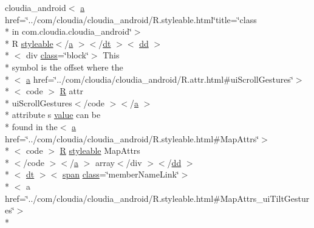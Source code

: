 \begin{DoxyCompactItemize}
cloudia\-\_\-android$<$ \hyperlink{style_8css_a5e8981582017bb8b84c21f148345d1f7}{a} href=\char`\"{}../com/cloudia/cloudia\-\_\-android/R.\-styleable.\-html\char`\"{}title=\char`\"{}class \\*
in com.\-cloudia.\-cloudia\-\_\-android\char`\"{}$>$\\*
 R \hyperlink{index-17_8html_ae6c9bf1e41380184b4b665ca9ab6ba0a}{styleable}$<$/\hyperlink{style_8css_a5e8981582017bb8b84c21f148345d1f7}{a} $>$$<$/\hyperlink{stylesheet_8css_a107565fb4039d33b041380d6e0ea1d80}{dt} $>$$<$ \hyperlink{stylesheet_8css_a47f4718a86835a7771ec592ece845221}{dd} $>$\\*
$<$ div \hyperlink{_tools_8html_acf06f836132665ba8114f5a414c2403f}{class}=\char`\"{}block\char`\"{}$>$ This \\*
symbol is the offset where the\\*
$<$ \hyperlink{style_8css_a5e8981582017bb8b84c21f148345d1f7}{a} href=\char`\"{}../com/cloudia/cloudia\-\_\-android/R.\-attr.\-html\#ui\-Scroll\-Gestures\char`\"{}$>$\\*
$<$ code $>$ \hyperlink{index-16_8html_a31e8fe59be5c20ce90a0090e28a0c1fe}{R} attr \\*
ui\-Scroll\-Gestures$<$/code $>$$<$/\hyperlink{style_8css_a5e8981582017bb8b84c21f148345d1f7}{a} $>$\\*
 attribute s \hyperlink{_my_s_q_l_connector_8measure_8html_afcc7a4b78ecd8fa7e713f8cfa0f51017}{value} can be \\*
found in the$<$ \hyperlink{style_8css_a5e8981582017bb8b84c21f148345d1f7}{a} href=\char`\"{}../com/cloudia/cloudia\-\_\-android/R.\-styleable.\-html\#Map\-Attrs\char`\"{}$>$\\*
$<$ code $>$ \hyperlink{index-16_8html_a31e8fe59be5c20ce90a0090e28a0c1fe}{R} \hyperlink{index-17_8html_ae6c9bf1e41380184b4b665ca9ab6ba0a}{styleable} Map\-Attrs\\*
$<$/code $>$$<$/\hyperlink{style_8css_a5e8981582017bb8b84c21f148345d1f7}{a} $>$ array$<$/div $>$$<$/\hyperlink{stylesheet_8css_a47f4718a86835a7771ec592ece845221}{dd} $>$\\*
$<$ \hyperlink{stylesheet_8css_a107565fb4039d33b041380d6e0ea1d80}{dt} $>$$<$ \hyperlink{stylesheet_8css_a8343996ebcf16220b04e54659aac31cc}{span} \hyperlink{_tools_8html_acf06f836132665ba8114f5a414c2403f}{class}=\char`\"{}member\-Name\-Link\char`\"{}$>$\\*
$<$ a href=\char`\"{}../com/cloudia/cloudia\-\_\-android/R.\-styleable.\-html\#Map\-Attrs\-\_\-ui\-Tilt\-Gestures\char`\"{}$>$\\*

\end{DoxyCompactItemize}
